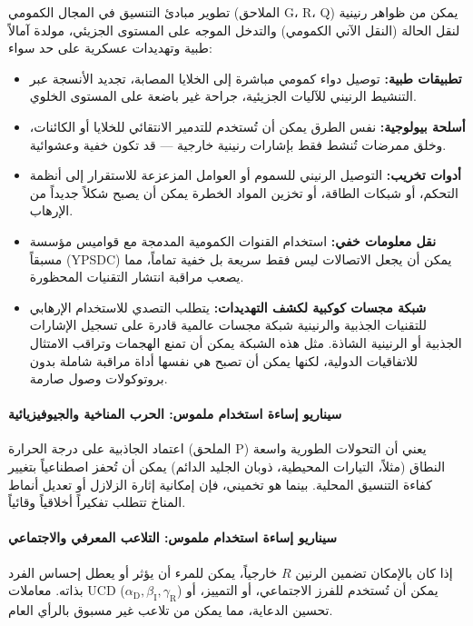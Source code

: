 \documentclass[12pt,a4paper]{article}
\theoremstyle{remark}
\newcommand{\alD}{\alpha_{\mathrm{D}}}
\newcommand{\beI}{\beta_{\mathrm{I}}}
\newcommand{\gaR}{\gamma_{\mathrm{R}}}
\begin{document}
	تطوير مبادئ التنسيق في المجال الكمومي (الملاحق G، R، Q) يمكن من ظواهر رنينية لنقل الحالة (النقل الآني الكمومي) والتدخل الموجه على المستوى الجزيئي، مولدة آمالاً طبية وتهديدات عسكرية على حد سواء:
	\begin{itemize}[leftmargin=*]
		\item \textbf{تطبيقات طبية:} توصيل دواء كمومي مباشرة إلى الخلايا المصابة، تجديد الأنسجة عبر التنشيط الرنيني للآليات الجزيئية، جراحة غير باضعة على المستوى الخلوي.
		\item \textbf{أسلحة بيولوجية:} نفس الطرق يمكن أن تُستخدم للتدمير الانتقائي للخلايا أو الكائنات، وخلق ممرضات تُنشط فقط بإشارات رنينية خارجية — قد تكون خفية وعشوائية.
		\item \textbf{أدوات تخريب:} التوصيل الرنيني للسموم أو العوامل المزعزعة للاستقرار إلى أنظمة التحكم، أو شبكات الطاقة، أو تخزين المواد الخطرة يمكن أن يصبح شكلاً جديداً من الإرهاب.
		\item \textbf{نقل معلومات خفي:} استخدام القنوات الكمومية المدمجة مع قواميس مؤسسة مسبقاً (YPSDC) يمكن أن يجعل الاتصالات ليس فقط سريعة بل خفية تماماً، مما يصعب مراقبة انتشار التقنيات المحظورة.
		\item \textbf{شبكة مجسات كوكبية لكشف التهديدات:} يتطلب التصدي للاستخدام الإرهابي للتقنيات الجذبية والرنينية شبكة مجسات عالمية قادرة على تسجيل الإشارات الجذبية أو الرنينية الشاذة. مثل هذه الشبكة يمكن أن تمنع الهجمات وتراقب الامتثال للاتفاقيات الدولية، لكنها يمكن أن تصبح هي نفسها أداة مراقبة شاملة بدون بروتوكولات وصول صارمة.
	\end{itemize}
	
	\paragraph{سيناريو إساءة استخدام ملموس: الحرب المناخية والجيوفيزيائية}
	اعتماد الجاذبية على درجة الحرارة (الملحق P) يعني أن التحولات الطورية واسعة النطاق (مثلاً، التيارات المحيطية، ذوبان الجليد الدائم) يمكن أن تُحفز اصطناعياً بتغيير كفاءة التنسيق المحلية. بينما هو تخميني، فإن إمكانية إثارة الزلازل أو تعديل أنماط المناخ تتطلب تفكيراً أخلاقياً وقائياً.
	
	\paragraph{سيناريو إساءة استخدام ملموس: التلاعب المعرفي والاجتماعي}
	إذا كان بالإمكان تضمين الرنين \(R\) خارجياً، يمكن للمرء أن يؤثر أو يعطل إحساس الفرد بذاته. معاملات UCD (\(\alD,\beI,\gaR\)) يمكن أن تُستخدم للفرز الاجتماعي، أو التمييز، أو تحسين الدعاية، مما يمكن من تلاعب غير مسبوق بالرأي العام.
	
\end{document}

